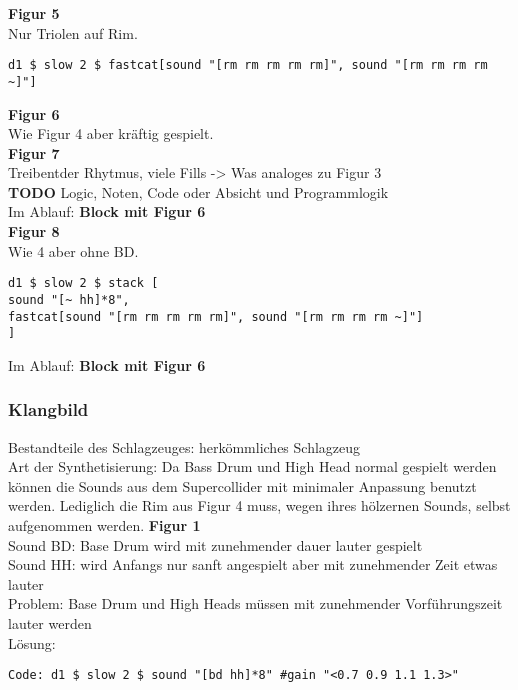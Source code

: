 \documentclass[
10pt, %
a4paper, %
oneside, %
headinclude,footinclude, %
BCOR5mm, %
]{scrartcl}
\begin{document}
\noindent \textbf{Figur 5}\\
Nur Triolen auf Rim.
\begin{lstlisting}
d1 $ slow 2 $ fastcat[sound "[rm rm rm rm rm]", sound "[rm rm rm rm ~]"]
\end{lstlisting}


\noindent \textbf{Figur 6}\\
Wie Figur 4 aber kräftig gespielt.\\

\noindent \textbf{Figur 7}\\
Treibentder Rhytmus, viele Fills -> Was analoges zu Figur 3\\
{\color{red}\textbf{TODO}} Logic, Noten, Code oder Absicht und Programmlogik\\

\noindent Im Ablauf: \textbf{Block mit Figur 6}\\

\noindent \textbf{Figur 8}\\
Wie 4 aber ohne BD.
\begin{lstlisting}
d1 $ slow 2 $ stack [
sound "[~ hh]*8",
fastcat[sound "[rm rm rm rm rm]", sound "[rm rm rm rm ~]"]
]
\end{lstlisting}

\noindent Im Ablauf: \textbf{Block mit Figur 6}

\subsubsection{Klangbild}
Bestandteile des Schlagzeuges: herkömmliches Schlagzeug\\
Art der Synthetisierung: Da Bass Drum und High Head normal gespielt werden können die Sounds aus dem Supercollider 
mit minimaler Anpassung benutzt werden. Lediglich die Rim aus Figur 4 muss, wegen ihres hölzernen Sounds, selbst 
aufgenommen werden.
\noindent \textbf{Figur 1}\\
Sound BD: Base Drum wird mit zunehmender dauer lauter gespielt\\
Sound HH: wird Anfangs nur sanft angespielt aber mit zunehmender Zeit etwas lauter\\
Problem: Base Drum und High Heads müssen mit zunehmender Vorführungszeit lauter werden\\ 
Lösung:\\
\begin{lstlisting}
Code: d1 $ slow 2 $ sound "[bd hh]*8" #gain "<0.7 0.9 1.1 1.3>"
\end{lstlisting}
\end{document}
